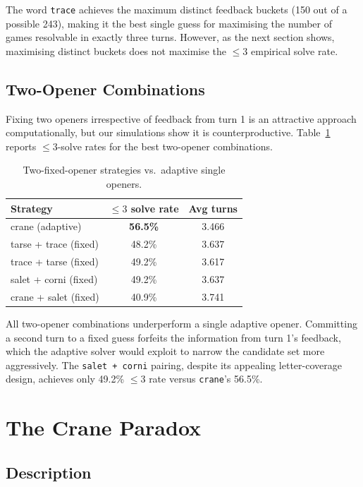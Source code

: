 \documentclass{article}
\begin{document}
The word \texttt{trace} achieves the maximum distinct feedback buckets (150 out
of a possible 243), making it the best single guess for maximising the number of
games resolvable in exactly three turns. However, as the next section shows,
maximising distinct buckets does not maximise the $\leq 3$ empirical solve rate.

\subsection{Two-Opener Combinations}

Fixing two openers irrespective of feedback from turn 1 is an attractive approach
computationally, but our simulations show it is counterproductive. Table~\ref{tab:two_openers}
reports $\leq 3$-solve rates for the best two-opener combinations.

\begin{table}[h]
  \centering
  \caption{Two-fixed-opener strategies vs.\ adaptive single openers.}
  \label{tab:two_openers}
  \begin{tabular}{lcc}
    \toprule
    Strategy & $\leq 3$ solve rate & Avg turns \\
    \midrule
    crane (adaptive) & \textbf{56.5\%} & 3.466 \\
    tarse + trace (fixed) & 48.2\% & 3.637 \\
    trace + tarse (fixed) & 49.2\% & 3.617 \\
    salet + corni (fixed) & 49.2\% & 3.637 \\
    crane + salet (fixed) & 40.9\% & 3.741 \\
    \bottomrule
  \end{tabular}
\end{table}

All two-opener combinations underperform a single adaptive opener. Committing a
second turn to a fixed guess forfeits the information from turn 1's feedback,
which the adaptive solver would exploit to narrow the candidate set more
aggressively. The \texttt{salet + corni} pairing, despite its appealing
letter-coverage design, achieves only 49.2\% $\leq 3$ rate versus \texttt{crane}'s
56.5\%.

\section{The Crane Paradox}
\label{sec:crane}

\subsection{Description}
\end{document}

